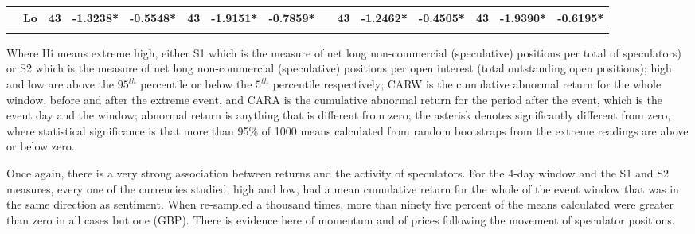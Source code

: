\documentclass{article}
\begin{document}
\begin{table}
\begin{threeparttable}
\begin{tabular}{llccccccccccccc}
& Lo & 43 &-1.3238* & -0.5548* & 43 & -1.9151* & -0.7859* & & 43 & -1.2462* & -0.4505*  &43 & -1.9390*  & -0.6195*  \\
\hline
\label{tabref:SP1}
\end{tabular}
\begin{tablenotes}
\small 
\item Where Hi means extreme high, either S1 which is the measure of net long non-commercial (speculative) positions per total of speculators) or S2 which is the measure of net long non-commercial (speculative) positions per open interest (total outstanding open positions); high and low are above the $95^{th}$ percentile or below the $5^{th}$ percentile respectively; CARW is the cumulative abnormal return for the whole window, before and after the extreme event, and CARA is the cumulative abnormal return for the period after the event, which is the event day and the window; abnormal return is anything that is different from zero; the asterisk denotes significantly different from zero, where statistical significance is that more than 95\% of 1000 means calculated from random bootstraps from the extreme readings are above or below zero.   
\end{tablenotes}	
\end{threeparttable}  
\end{table}

Once again, there is a very strong association between returns and the activity of speculators.  For the 4-day window and the S1 and S2 measures, every one of the currencies studied, high and low, had a mean cumulative return for the whole of the event window that was in the same direction as sentiment.  When re-sampled a thousand times, more than ninety five percent of the means calculated were greater than zero in all cases but one (GBP).  There is evidence here of momentum and of prices following the movement of speculator positions. 
\end{document}
